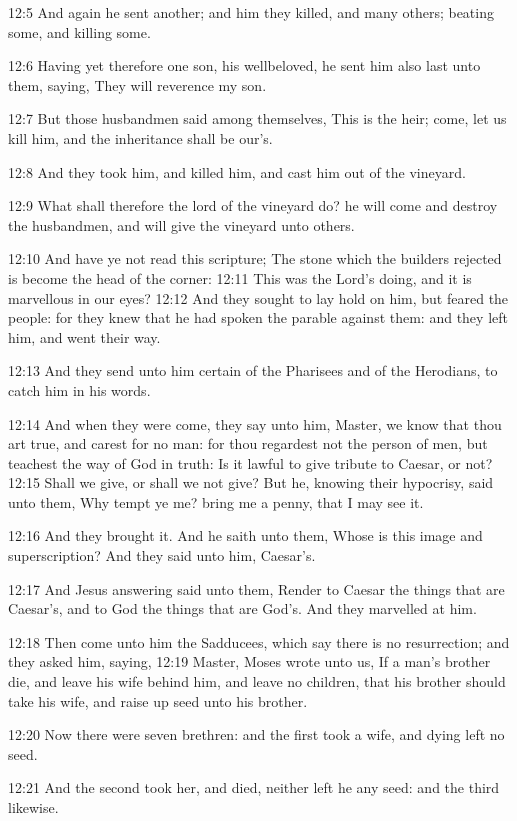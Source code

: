 12:5 And again he sent another; and him they killed, and many others; beating some, and killing some.

12:6 Having yet therefore one son, his wellbeloved, he sent him also last unto them, saying, They will reverence my son.

12:7 But those husbandmen said among themselves, This is the heir; come, let us kill him, and the inheritance shall be our's.

12:8 And they took him, and killed him, and cast him out of the vineyard.

12:9 What shall therefore the lord of the vineyard do? he will come and destroy the husbandmen, and will give the vineyard unto others.

12:10 And have ye not read this scripture; The stone which the builders rejected is become the head of the corner: 12:11 This was the Lord's doing, and it is marvellous in our eyes?  12:12 And they sought to lay hold on him, but feared the people: for they knew that he had spoken the parable against them: and they left him, and went their way.

12:13 And they send unto him certain of the Pharisees and of the Herodians, to catch him in his words.

12:14 And when they were come, they say unto him, Master, we know that thou art true, and carest for no man: for thou regardest not the person of men, but teachest the way of God in truth: Is it lawful to give tribute to Caesar, or not?  12:15 Shall we give, or shall we not give? But he, knowing their hypocrisy, said unto them, Why tempt ye me? bring me a penny, that I may see it.

12:16 And they brought it. And he saith unto them, Whose is this image and superscription? And they said unto him, Caesar's.

12:17 And Jesus answering said unto them, Render to Caesar the things that are Caesar's, and to God the things that are God's. And they marvelled at him.

12:18 Then come unto him the Sadducees, which say there is no resurrection; and they asked him, saying, 12:19 Master, Moses wrote unto us, If a man's brother die, and leave his wife behind him, and leave no children, that his brother should take his wife, and raise up seed unto his brother.

12:20 Now there were seven brethren: and the first took a wife, and dying left no seed.

12:21 And the second took her, and died, neither left he any seed: and the third likewise.

